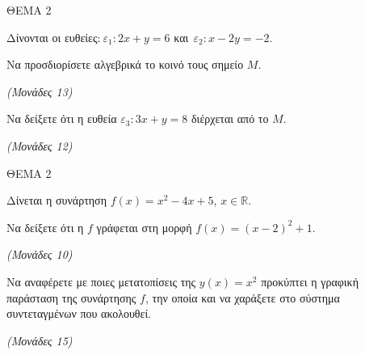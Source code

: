 \documentclass[11pt,a4paper,twoside]{book}
\newcommand{\monades}[1]{\hfill \textit{(Μονάδες #1)}}
\begin{document}
\vspace{4mm}

ΘΕΜΑ 2

Δίνονται οι ευθείες:$\ \varepsilon_{1}:2x + y = 6$ και$\ {\ \varepsilon}_{2}:x - 2y = - 2$.

\begin{alist}
\item Να προσδιορίσετε αλγεβρικά το κοινό τους σημείο $M$.

\monades{13}

\item Να δείξετε ότι η ευθεία $\varepsilon_{3}:3x + y = 8$ διέρχεται από το $M$.

\monades{12}
\end{alist}

\vspace{4mm}

ΘΕΜΑ 2

Δίνεται η συνάρτηση $f(x) = x^{2} - 4x + 5$, $x\mathbb{\in R}$.

\begin{alist}
\item Να δείξετε ότι η $f$ γράφεται στη μορφή $f(x) = (x - 2)^2 + 1$.

\monades{10}

\item Να αναφέρετε με ποιες μετατοπίσεις της $y(x) = x^{2}$ προκύπτει η γραφική παράσταση της συνάρτησης $f$, την οποία και να χαράξετε στο σύστημα συντεταγμένων που ακολουθεί.

\monades{15}


\begin{center}


\end{center}
\end{alist}
\end{document}
